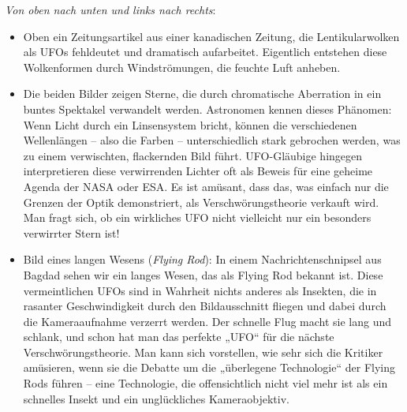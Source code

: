 \documentclass{scrartcl}
\begin{document}
\textit{Von oben nach unten und links nach rechts}:

\begin{itemize}
	\item Oben ein Zeitungsartikel aus einer kanadischen Zeitung, die Lentikularwolken als UFOs fehldeutet und dramatisch aufarbeitet. Eigentlich entstehen diese Wolkenformen durch Windströmungen, die feuchte Luft anheben. 

	\item Die beiden Bilder zeigen Sterne, die durch chromatische Aberration in ein buntes Spektakel verwandelt werden. Astronomen kennen dieses Phänomen: Wenn Licht durch ein Linsensystem bricht, können die verschiedenen Wellenlängen – also die Farben – unterschiedlich stark gebrochen werden, was zu einem verwischten, flackernden Bild führt. UFO-Gläubige hingegen interpretieren diese verwirrenden Lichter oft als Beweis für eine geheime Agenda der NASA oder ESA. Es ist amüsant, dass das, was einfach nur die Grenzen der Optik demonstriert, als Verschwörungstheorie verkauft wird. Man fragt sich, ob ein wirkliches UFO nicht vielleicht nur ein besonders verwirrter Stern ist! 

		 
	\item Bild eines langen Wesens (\textit{Flying Rod}): In einem Nachrichtenschnipsel aus Bagdad sehen wir ein langes Wesen, das als Flying Rod bekannt ist. Diese vermeintlichen UFOs sind in Wahrheit nichts anderes als Insekten, die in rasanter Geschwindigkeit durch den Bildausschnitt fliegen und dabei durch die Kameraaufnahme verzerrt werden. Der schnelle Flug macht sie lang und schlank, und schon hat man das perfekte „UFO“ für die nächste Verschwörungstheorie. Man kann sich vorstellen, wie sehr sich die Kritiker amüsieren, wenn sie die Debatte um die „überlegene Technologie“ der Flying Rods führen – eine Technologie, die offensichtlich nicht viel mehr ist als ein schnelles Insekt und ein unglückliches Kameraobjektiv. 


\end{itemize}
\end{document}

